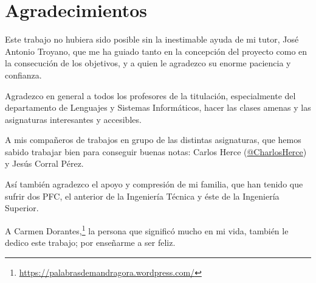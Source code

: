 
\thispagestyle{plain}
\section*{Agradecimientos}

Este trabajo no hubiera sido posible sin la inestimable ayuda de mi tutor, José Antonio Troyano, que me ha guiado tanto en la concepción del proyecto como en la consecución de los objetivos, y a quien le agradezco su enorme paciencia y confianza.

Agradezco en general a todos los profesores de la titulación, especialmente del departamento de Lenguajes y Sistemas Informáticos, hacer las clases amenas y las asignaturas interesantes y accesibles.

A mis compañeros de trabajos en grupo de las distintas asignaturas, que hemos sabido trabajar bien para conseguir buenas notas: Carlos Herce (\href{https://twitter.com/charlosherce}{@CharlosHerce}) y Jesús Corral Pérez.

Así también agradezco el apoyo y compresión de mi familia, que han tenido que sufrir dos PFC, el anterior de la Ingeniería Técnica y éste de la Ingeniería Superior.

A Carmen Dorantes,\footnote{\url{https://palabrasdemandragora.wordpress.com/}} la persona que significó mucho en mi vida, también le dedico este trabajo; por enseñarme a ser feliz.
